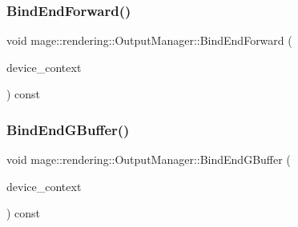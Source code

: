 \hypertarget{classmage_1_1rendering_1_1_output_manager_ad0b43f26a2762ae116bc72b0cf21a6de}{}\label{classmage_1_1rendering_1_1_output_manager_ad0b43f26a2762ae116bc72b0cf21a6de} 
\subsubsection{\texorpdfstring{Bind\+End\+Forward()}{BindEndForward()}}
{\footnotesize\ttfamily void mage\+::rendering\+::\+Output\+Manager\+::\+Bind\+End\+Forward (\begin{DoxyParamCaption}\item[{I\+D3\+D11\+Device\+Context \&}]{device\+\_\+context }\end{DoxyParamCaption}) const\hspace{0.3cm}{\ttfamily [noexcept]}}

\hypertarget{classmage_1_1rendering_1_1_output_manager_a380113a2b1c9049cfd2367a6344683b7}{}\label{classmage_1_1rendering_1_1_output_manager_a380113a2b1c9049cfd2367a6344683b7} 
\subsubsection{\texorpdfstring{Bind\+End\+G\+Buffer()}{BindEndGBuffer()}}
{\footnotesize\ttfamily void mage\+::rendering\+::\+Output\+Manager\+::\+Bind\+End\+G\+Buffer (\begin{DoxyParamCaption}\item[{I\+D3\+D11\+Device\+Context \&}]{device\+\_\+context }\end{DoxyParamCaption}) const\hspace{0.3cm}{\ttfamily [noexcept]}}

\hypertarget{classmage_1_1rendering_1_1_output_manager_a548e6003d34916b174f74f6f1b5e85a2}{}\label{classmage_1_1rendering_1_1_output_manager_a548e6003d34916b174f74f6f1b5e85a2} 
